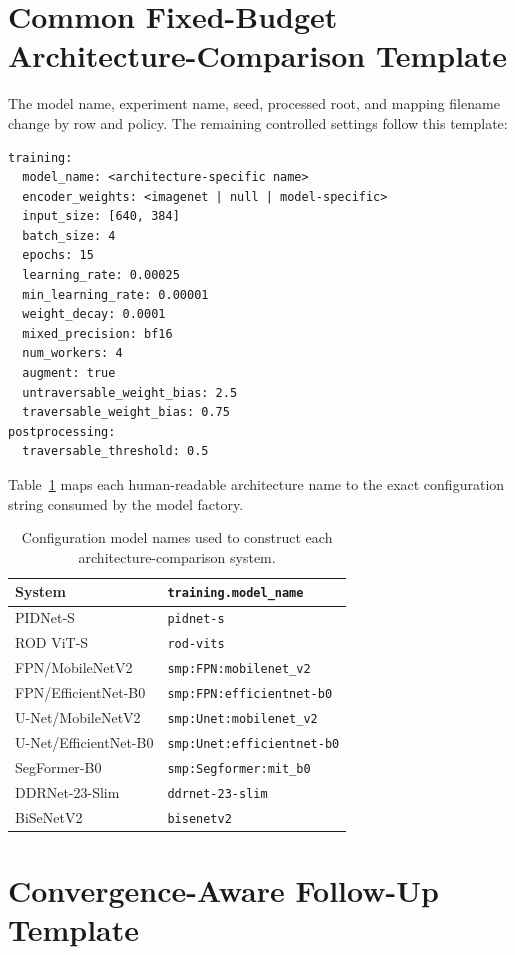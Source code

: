 \section{Common Fixed-Budget Architecture-Comparison Template}

The model name, experiment name, seed, processed root, and mapping filename
change by row and policy. The remaining controlled settings follow this
template:

\begin{lstlisting}
training:
  model_name: <architecture-specific name>
  encoder_weights: <imagenet | null | model-specific>
  input_size: [640, 384]
  batch_size: 4
  epochs: 15
  learning_rate: 0.00025
  min_learning_rate: 0.00001
  weight_decay: 0.0001
  mixed_precision: bf16
  num_workers: 4
  augment: true
  untraversable_weight_bias: 2.5
  traversable_weight_bias: 0.75
postprocessing:
  traversable_threshold: 0.5
\end{lstlisting}

Table~\ref{tab:appendix_model_names} maps each human-readable architecture
name to the exact configuration string consumed by the model factory.

\begin{table}[H]
\centering
\caption{Configuration model names used to construct each architecture-comparison
system.}
\label{tab:appendix_model_names}
\small
\begin{tabularx}{\textwidth}{@{}lX@{}}
\toprule
\textbf{System} & \textbf{\texttt{training.model\_name}} \\
\midrule
PIDNet-S & \texttt{pidnet-s} \\
ROD ViT-S & \texttt{rod-vits} \\
FPN/MobileNetV2 & \texttt{smp:FPN:mobilenet\_v2} \\
FPN/EfficientNet-B0 & \texttt{smp:FPN:efficientnet-b0} \\
U-Net/MobileNetV2 & \texttt{smp:Unet:mobilenet\_v2} \\
U-Net/EfficientNet-B0 & \texttt{smp:Unet:efficientnet-b0} \\
SegFormer-B0 & \texttt{smp:Segformer:mit\_b0} \\
DDRNet-23-Slim & \texttt{ddrnet-23-slim} \\
BiSeNetV2 & \texttt{bisenetv2} \\
\bottomrule
\end{tabularx}
\end{table}

\section{Convergence-Aware Follow-Up Template}

